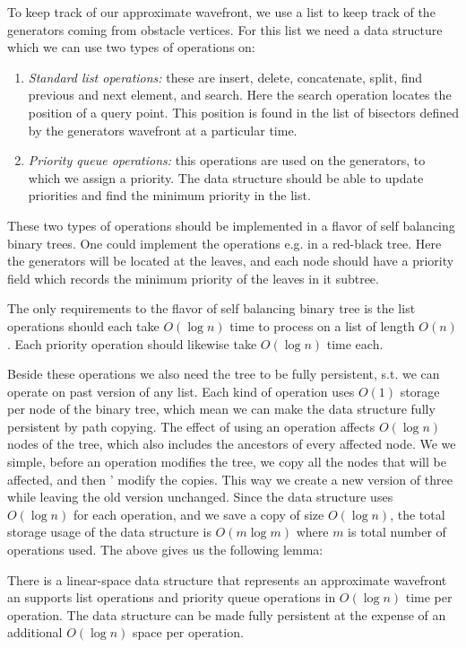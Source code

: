 To keep track of our approximate wavefront, we use a list to keep track of the generators coming from 
obstacle vertices. For this list we need a data structure which we can use two types of operations on:

\begin{enumerate}
\item \textit{Standard list operations:} these are insert, delete, concatenate, split, find previous 
			  and next element, and search. Here the search operation locates the position of a query 
              point. This position is found in the list of bisectors defined by the generators 
              wavefront at a particular time. 
\item \textit{Priority queue operations:} this operations are used on the generators, to which we 
			  assign a priority. The data structure should be able to  update priorities and find the 
              minimum priority in the list.
\end{enumerate}

These two types of operations should be implemented in a flavor of self balancing binary trees. One 
could implement the operations e.g. in a red-black tree. Here the generators will be located at the 
leaves, and each node should have a priority field which records the minimum priority of the leaves in 
it subtree.

The only requirements to the flavor of self balancing binary tree is the list operations should each 
take $O(\log n)$ time to process on a list of length $O(n)$. Each priority operation should likewise 
take $O(\log n)$ time each. 

Beside these operations we also need the tree to be fully persistent, s.t. we can operate on past 
version of any list. Each kind of operation uses $O(1)$ storage per node of the binary tree, which 
mean we can make the data structure fully persistent by path copying. The effect of using an operation 
affects $O(\log n)$ nodes of the tree, which also includes the ancestors of every affected node. We we 
simple, before an operation modifies the tree, we copy all the nodes that will be affected, and then '
modify the copies. This way we create a new version of three while leaving the old version unchanged.
Since the data structure uses $O(\log n)$ for each operation, and we save a copy of size $O(\log n)$, 
the total storage usage of the data structure is $O(m \log m)$ where $m$ is total number of operations 
used. The above gives us the following lemma:

\begin{Lemma} 
There is a linear-space data structure that represents an approximate wavefront an supports list 
operations and priority queue operations in $O(\log n)$ time per operation. The data structure can be 
made fully persistent at the expense of an additional $O(\log n)$ space per operation.
\end{Lemma}

